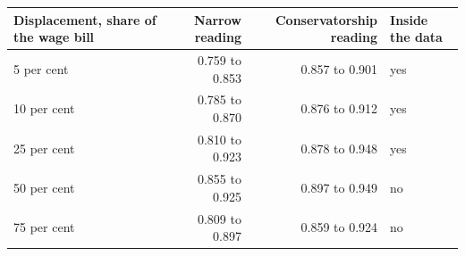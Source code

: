 \begin{tabular}{lrrl}
\toprule
Displacement, share of the wage bill & Narrow reading & Conservatorship reading & Inside the data \\
\midrule
5 per cent & 0.759 to 0.853 & 0.857 to 0.901 & yes \\
10 per cent & 0.785 to 0.870 & 0.876 to 0.912 & yes \\
25 per cent & 0.810 to 0.923 & 0.878 to 0.948 & yes \\
50 per cent & 0.855 to 0.925 & 0.897 to 0.949 & no \\
75 per cent & 0.809 to 0.897 & 0.859 to 0.924 & no \\
\bottomrule
\end{tabular}
